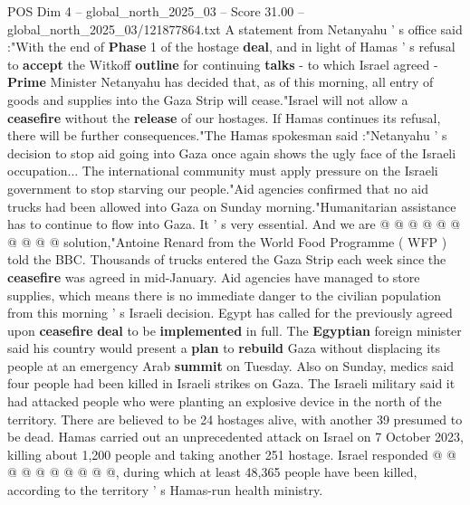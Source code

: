 \begin{textsample}{POS Dim 4 – global\_north\_2025\_03 – Score 31.00 – global\_north\_2025\_03/121877864.txt}
A statement from Netanyahu ' s office said :"With the end of \textbf{Phase} 1 of the hostage \textbf{deal}, and in light of Hamas ' s refusal to \textbf{accept} the Witkoff \textbf{outline} for continuing \textbf{talks} - to which Israel agreed - \textbf{Prime} Minister Netanyahu has decided that, as of this morning, all entry of goods and supplies into the Gaza Strip will cease."Israel will not allow a \textbf{ceasefire} without the \textbf{release} of our hostages.
If Hamas continues its refusal, there will be further consequences."The Hamas spokesman said :"Netanyahu ' s decision to stop aid going into Gaza once again shows the ugly face of the Israeli occupation...
The international community must apply pressure on the Israeli government to stop starving our people."Aid agencies confirmed that no aid trucks had been allowed into Gaza on Sunday morning."Humanitarian assistance has to continue to flow into Gaza.
It ' s very essential.
And we are @ @ @ @ @ @ @ @ @ @ solution,"Antoine Renard from the World Food Programme ( WFP ) told the BBC.
Thousands of trucks entered the Gaza Strip each week since the \textbf{ceasefire} was agreed in mid-January.
Aid agencies have managed to store supplies, which means there is no immediate danger to the civilian population from this morning ' s Israeli decision.
Egypt has called for the previously agreed upon \textbf{ceasefire} \textbf{deal} to be \textbf{implemented} in full.
The \textbf{Egyptian} foreign minister said his country would present a \textbf{plan} to \textbf{rebuild} Gaza without displacing its people at an emergency Arab \textbf{summit} on Tuesday.
Also on Sunday, medics said four people had been killed in Israeli strikes on Gaza.
The Israeli military said it had attacked people who were planting an explosive device in the north of the territory.
There are believed to be 24 hostages alive, with another 39 presumed to be dead.
Hamas carried out an unprecedented attack on Israel on 7 October 2023, killing about 1,200 people and taking another 251 hostage.
Israel responded @ @ @ @ @ @ @ @ @ @, during which at least 48,365 people have been killed, according to the territory ' s Hamas-run health ministry.

\end{textsample}
